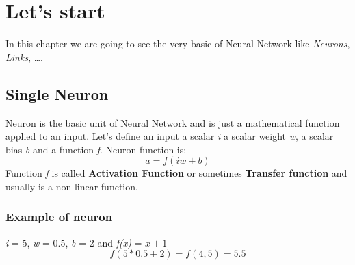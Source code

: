 \documentclass[12pt,a4paper,twoside,openright]{scrbook}
\begin{document}
\chapter{Let's start}

In this chapter we are going to see the very basic of Neural Network like \textit{Neurons}, \textit{Links}, \ldots.

\section{Single Neuron}
Neuron is the basic unit of Neural Network and is just a mathematical function applied to an input.
Let's define an input a scalar \textit{i} a scalar weight \textit{w}, a scalar bias \textit{b} and a function \textit{f}.
Neuron function is:
\begin{equation}
a = f(iw + b)
\end{equation}
Function \textit{f} is called \textbf{Activation Function} or sometimes \textbf{Transfer function} and usually is a non linear function.

\subsection{Example of neuron}
\textit{i} = 5, \textit{w} = 0.5, \textit{b} = 2 and \textit{f(x)} = $x + 1$  
\begin{equation}
f(5*0.5 + 2) = f(4,5) = 5.5
\end{equation}
\end{document}
